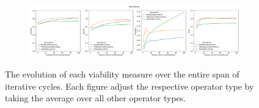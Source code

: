\begin{figure}[htbp]
\begin{subfigure}[c]{0.9\textwidth}
        \label{fig:exp1-sparcity}
    \end{subfigure}
    \hfill
    \begin{subfigure}[c]{0.9\textwidth}
        \centering
        \includegraphics[width=\textwidth]{figures/generated/exp1_recombiner.png}
        \label{fig:exp1-delta}
    \end{subfigure}
    \caption{The evolution of each viability measure over the entire span of iterative cycles. Each figure adjust the respective operator type by taking the average over all other operator types.}
    \label{fig:exp1-measure}
\end{figure}